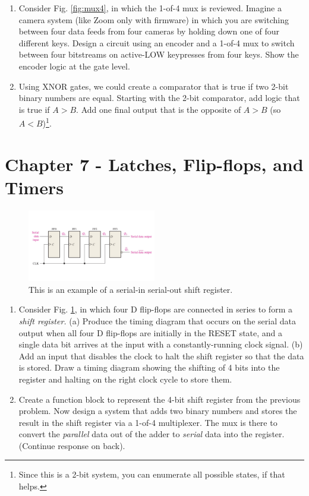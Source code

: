 \documentclass[10pt]{article}
\begin{document}
\begin{enumerate}
\item Consider Fig. \ref{fig:mux4}, in which the 1-of-4 mux is reviewed.  Imagine a camera system (like Zoom only with firmware) in which you are switching between four data feeds from four cameras by holding down one of four different keys.  Design a circuit using an encoder and a 1-of-4 mux to switch between four bitstreams on active-LOW keypresses from four keys. Show the encoder logic at the gate level.  \\ \vspace{3cm}
\item Using XNOR gates, we could create a comparator that is true if two 2-bit binary numbers are equal.  Starting with the 2-bit comparator, add logic that is true if $A>B$.  Add one final output that is the opposite of $A>B$ (so $A<B$)\footnote{Since this is a 2-bit system, you can enumerate all possible states, if that helps.}. \\ \vspace{3cm}
\end{enumerate}

\section{Chapter 7 - Latches, Flip-flops, and Timers}
\label{sec:latch}

\begin{figure}[ht]
\centering
\includegraphics[width=0.5\textwidth,trim=0cm 2cm 0cm 2cm,clip=true]{figures/latches2.pdf}
\caption{\label{fig:latches} This is an example of a serial-in serial-out shift register.}
\end{figure}

\begin{enumerate}
\item Consider Fig. \ref{fig:latches}, in which four D flip-flops are connected in series to form a \textit{shift register.}  (a) Produce the timing diagram that occurs on the serial data output when all four D flip-flops are initially in the RESET state, and a single data bit arrives at the input with a constantly-running clock signal.  (b) Add an input that disables the clock to halt the shift register so that the data is stored.  Draw a timing diagram showing the shifting of 4 bits into the register and halting on the right clock cycle to store them. \\ \vspace{3cm}
\item Create a function block to represent the 4-bit shift register from the previous problem.  Now design a system that adds two binary numbers and stores the result in the shift register via a 1-of-4 multiplexer.  The mux is there to convert the \textit{parallel} data out of the adder to \textit{serial} data into the register. (Continue response on back).
\end{enumerate}
\end{document}
